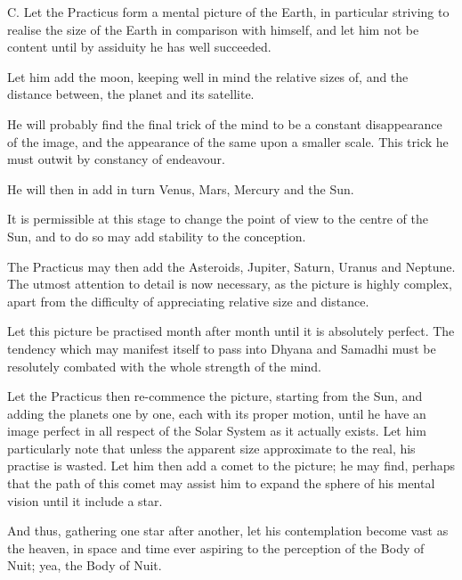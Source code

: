      
\begin{quoting}

C. Let the Practicus form a mental picture of the Earth, in particular striving to realise the size of the Earth in comparison with himself, and let him not be content until by assiduity he has well succeeded.

Let him add the moon, keeping well in mind the relative sizes of, and the distance between, the planet and its satellite.
     
He will probably find the final trick of the mind to be a constant disappearance of the image, and the appearance of the same upon a smaller scale. This trick he must outwit by constancy of endeavour.
     
He will then in add in turn Venus, Mars, Mercury and the Sun.
     
It is permissible at this stage to change the point of view to the centre of the Sun, and to do so may add stability to the conception.
     
The Practicus may then add the Asteroids, Jupiter, Saturn, Uranus and Neptune. The utmost attention to detail is now necessary, as the picture is highly complex, apart from the difficulty of appreciating relative size and distance.

Let this picture be practised month after month until it is absolutely perfect. The tendency which may manifest itself to pass into Dhyana and Samadhi must be resolutely combated with the whole strength of the mind.

Let the Practicus then re-commence the picture, starting from the Sun, and adding the planets one by one, each with its proper motion, until he have an image perfect in all respect of the Solar System as it actually exists. Let him particularly note that unless the apparent size approximate to the real, his practise is wasted. Let him then add a comet to the picture; he may find, perhaps that the path of this comet may assist him to expand the sphere of his mental vision until it include a star.
     
And thus, gathering one star after another, let his contemplation become vast as the heaven, in space and time ever aspiring to the perception of the Body of Nuit; yea, the Body of Nuit. 
\end{quoting}

